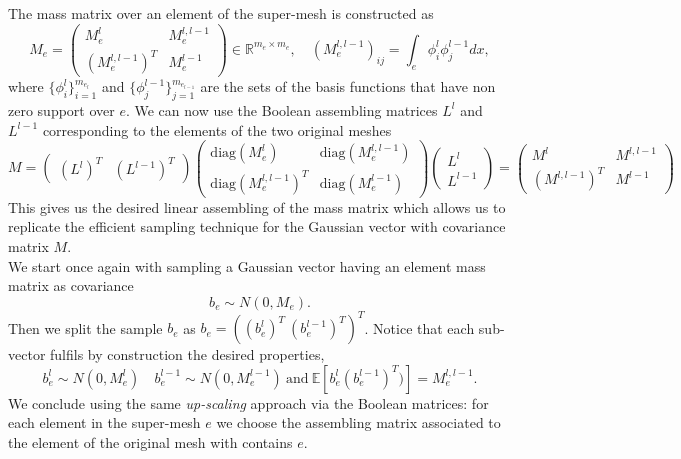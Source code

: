 \documentclass[a4paper, 11pt, oneside]{scrartcl}
\begin{document}
The mass matrix over an element of the super-mesh is constructed as
\begin{equation}
M_e = \begin{pmatrix}
M_e^l & M_e^{l,l-1} \\
(M_e^{l,l-1})^T & M_e^{l-1} 
\end{pmatrix} \in \mathbb{R}^{ m_e \times m_e }, \quad ( M_e^{l,l-1})_{ij} = \int_e \phi_i^l \phi_j^{l-1} dx,
\end{equation}
where \( \{ \phi_i^l \}_{i=1}^{m_{e_l}} \) and \( \{ \phi_j^{l-1} \}_{j=1}^{m_{e_{l-1}}} \) are the sets of the basis functions that have non zero support over \(e\). 
We can now use the Boolean assembling matrices \(L^l\) and \( L^{l-1} \) corresponding to the elements of the two original meshes
\begin{equation}
M = \begin{pmatrix}
(L^l)^T & (L^{l-1})^T
\end{pmatrix} 
\begin{pmatrix}
\text{diag}(M_e^l) & \text{diag}(M_e^{l,l-1})\\
\text{diag}(M_e^{l,l-1})^T & \text{diag}(M_e^{l-1})
\end{pmatrix}
\begin{pmatrix}
L^l \\
L^{l-1}
\end{pmatrix} = \begin{pmatrix}
M^l & M^{l,l-1} \\
(M^{l,l-1})^T & M^{l-1}
\end{pmatrix}
\end{equation}
This gives us the desired linear assembling of the mass matrix which allows us to replicate the efficient sampling technique for the Gaussian vector with covariance matrix \(M\). \\
We start once again with sampling a Gaussian vector having an element mass matrix as covariance
\begin{equation}
b_e \sim N(0,M_e). 
\end{equation}
Then we split the sample \(b_e \) as \(b_e = ((b_e^l)^T \ (b_e^{l-1})^T)^T \). Notice that each sub-vector fulfils by construction the desired properties,
\begin{equation}
b_e^l \sim N(0,M_e^l) \quad b_e^{l-1} \sim N(0,M_e^{l-1}) \ \text{and} \ \mathbb{E}[b_e^l (b_e^{l-1})^T) ] = M_e^{l,l-1}.
\end{equation}
We conclude using the same \textit{up-scaling} approach via the Boolean matrices: for each element in the super-mesh \(e\) we choose the assembling matrix associated to the element of the original mesh with contains \(e\).
\end{document}
